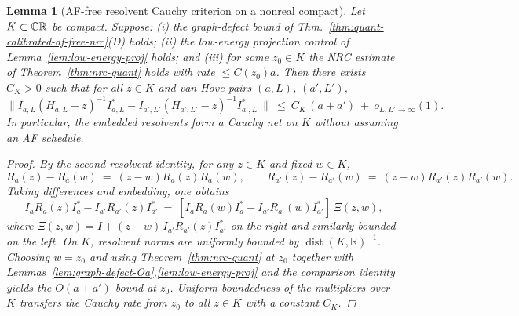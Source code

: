 \documentclass[11pt]{amsart}
\theoremstyle{plain}
\newtheorem{lemma}[theorem]{Lemma}
\theoremstyle{definition}
\theoremstyle{remark}
\begin{document}
\begin{lemma}[AF-free resolvent Cauchy criterion on a nonreal compact]\label{lem:af-free-cauchy}
Let $K\subset \mathbb C\\\mathbb R$ be compact. Suppose: (i) the graph-defect bound of Thm.~\ref{thm:quant-calibrated-af-free-nrc}(D) holds; (ii) the low-energy projection control of Lemma~\ref{lem:low-energy-proj} holds; and (iii) for some $z_0\in K$ the NRC estimate of Theorem~\ref{thm:nrc-quant} holds with rate $\le C(z_0) a$. Then there exists $C_K>0$ such that for all $z\in K$ and van Hove pairs $(a,L)$, $(a',L')$,
\[
  \big\| I_{a,L}(H_{a,L}-z)^{-1} I_{a,L}^* - I_{a',L'}(H_{a',L'}-z)^{-1} I_{a',L'}^* \big\|
  \ \le\ C_K\,(a+a')\ +\ o_{L,L'\to\infty}(1).
\]
In particular, the embedded resolvents form a Cauchy net on $K$ without assuming an AF schedule.
\begin{proof}
By the second resolvent identity, for any $z\in K$ and fixed $w\in K$,
\[
  R_{a}(z)-R_{a}(w)\ =\ (z-w) R_{a}(z) R_{a}(w),\qquad R_{a'}(z)-R_{a'}(w)\ =\ (z-w) R_{a'}(z) R_{a'}(w).
\]
Taking differences and embedding, one obtains
\[
  I_{a}R_{a}(z)I_{a}^* - I_{a'}R_{a'}(z)I_{a'}^*\ =\ [I_{a}R_{a}(w)I_{a}^* - I_{a'}R_{a'}(w)I_{a'}^*]\,\Xi(z,w),
\]
where $\Xi(z,w)=I+(z-w)\,I_{a'}R_{a'}(z)I_{a'}^*$ on the right and similarly bounded on the left. On $K$, resolvent norms are uniformly bounded by $\operatorname{dist}(K,\mathbb R)^{-1}$. Choosing $w=z_0$ and using Theorem~\ref{thm:nrc-quant} at $z_0$ together with Lemmas~\ref{lem:graph-defect-Oa},\ref{lem:low-energy-proj} and the comparison identity yields the $O(a+a')$ bound at $z_0$. Uniform boundedness of the multipliers over $K$ transfers the Cauchy rate from $z_0$ to all $z\in K$ with a constant $C_K$.
\end{proof}
\end{lemma}
\end{document}
